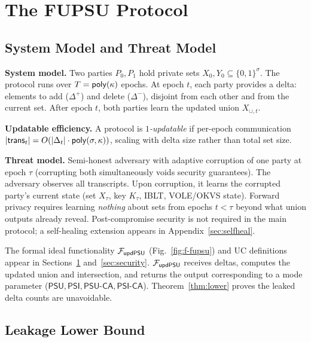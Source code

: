 \section{The FUPSU Protocol}
\label{sec:protocol}

	
\subsection{System Model and Threat Model}

\textbf{System model.} Two parties $P_0, P_1$ hold private sets $X_0, Y_0
\subseteq \{0,1\}^\sigma$. The protocol runs over $T = \mathsf{poly}(\kappa)$ epochs.
At epoch $t$, each party provides a delta: elements to add ($\Delta^+$) and
delete ($\Delta^-$), disjoint from each other and from the current set. After
epoch $t$, both parties learn the updated union $X_{\cup,t}$.

\textbf{Updatable efficiency.} A protocol is \emph{$1$-updatable} if per-epoch
communication $|\mathsf{trans}_t| = O(|\Delta_t| \cdot \mathsf{poly}(\sigma, \kappa))$,
scaling with delta size rather than total set size.

\textbf{Threat model.} Semi-honest adversary with adaptive corruption of one
party at epoch $\tau$ (corrupting both simultaneously voids security guarantees). The adversary observes all
transcripts. Upon corruption, it learns the corrupted party's current state
(set $X_\tau$, key $K_\tau$, IBLT, VOLE/OKVS state). Forward privacy requires
learning \emph{nothing} about sets from epochs $t < \tau$ beyond what union
outputs already reveal. Post-compromise security is not required in the main
protocol; a self-healing extension appears in Appendix~\ref{sec:selfheal}.

The formal ideal functionality $\mathcal{F}_{\mathsf{updPSU}}$
(Fig.~\ref{fig:f-fupsu}) and UC definitions appear in
Sections~\ref{sec:protocol} and~\ref{sec:security}.
$\mathcal{F}_{\mathsf{updPSU}}$ receives deltas, computes the updated union and
intersection, and returns the output corresponding to a mode parameter
($\mathsf{PSU}, \mathsf{PSI}, \mathsf{PSU}\text{-}\mathsf{CA},
\mathsf{PSI}\text{-}\mathsf{CA}$). Theorem~\ref{thm:lower} proves the
leaked delta counts are unavoidable.

\subsection{Leakage Lower Bound}\label{sec:lower}

